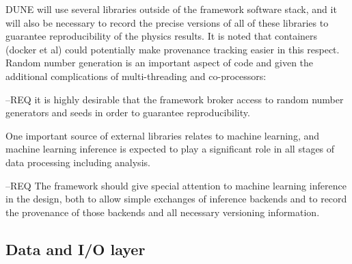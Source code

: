 \documentclass[../main-v1.tex]{subfiles}
\begin{document}
DUNE will use several libraries outside of the framework software stack, and it will also be necessary to record the precise versions of all of these libraries to guarantee reproducibility of the physics results.  It is noted that containers (docker et al) could potentially make provenance tracking easier in this respect.  Random number generation is an important aspect of code and given the additional complications of multi-threading and co-processors:

--REQ it is highly desirable that the framework broker access to random number generators and seeds in order to guarantee reproducibility.  

One important source of external libraries relates to machine learning, and machine learning inference is expected to play a significant role in all stages of data processing including analysis.  

--REQ The framework should give special attention to machine learning inference in the design, both to allow simple exchanges of inference backends and to record the provenance of those backends and all necessary versioning information.





\subsection{Data and I/O layer} %




\end{document}
